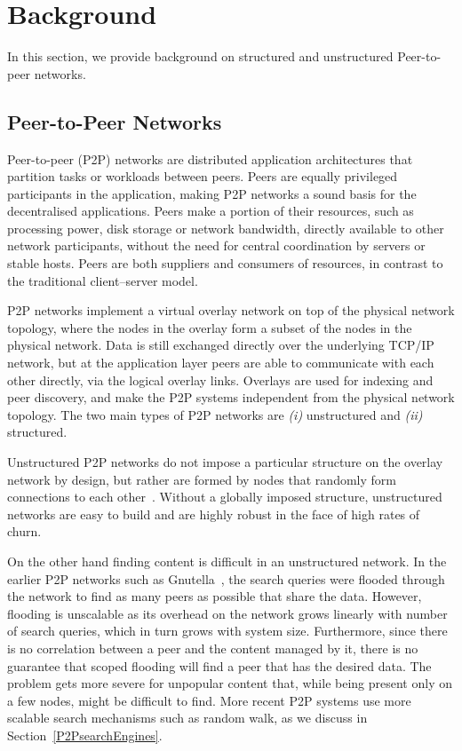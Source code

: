 \section{Background}
\label{sec:background}
In this section, we provide background on structured and unstructured Peer-to-peer networks. 

\subsection{Peer-to-Peer Networks}
Peer-to-peer (P2P) networks are distributed application architectures that partition tasks or workloads between peers. Peers are equally privileged participants in the application, making P2P networks a sound basis for the decentralised applications. Peers make a portion of their resources, such as processing power, disk storage or network bandwidth, directly available to other network participants, without the need for central coordination by servers or stable hosts. Peers are both suppliers and consumers of resources, in contrast to the traditional client–server model.

P2P networks implement a virtual overlay network on top of the physical network topology, where the nodes in the overlay form a subset of the nodes in the physical network. Data is still exchanged directly over the underlying TCP/IP network, but at the application layer peers are able to communicate with each other directly, via the logical overlay links. Overlays are used for indexing and peer discovery, and make the P2P systems independent from the physical network topology. The two main types of P2P networks are \textit{(i)} unstructured and \textit{(ii)} structured. 

Unstructured P2P networks do not impose a particular structure on the overlay network by design, but rather are formed by nodes that randomly form connections to each other~\cite{gnutella, gossip, kazaa}. Without a globally imposed structure, unstructured networks are easy to build and are highly robust in the face of high rates of churn. 

On the other hand finding content is difficult in an unstructured network. In the earlier P2P networks such as Gnutella~\cite{gnutella}, the search queries were flooded through the network to find as many peers as possible that share the data. However, flooding is unscalable as its overhead on the network grows linearly with number of search queries, which in turn grows with system size. Furthermore, since there is no correlation between a peer and the content managed by it, there is no guarantee that scoped flooding will find a peer that has the desired data. The problem gets more severe for unpopular content that, while being present only on a few nodes, might be difficult to find. More recent P2P systems use more scalable search mechanisms such as random walk, as we discuss in Section~\ref{P2PsearchEngines}. 


